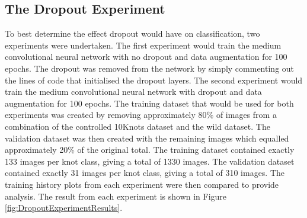 \documentclass{l4proj}
\begin{document}
\subsection{The Dropout Experiment}
To best determine the effect dropout would have on classification, two experiments were undertaken.
The first experiment would train the medium convolutional neural network with no dropout and data augmentation for 100 epochs.
The dropout was removed from the network by simply commenting out the lines of code that initialised the dropout layers.
The second experiment would train the medium convolutional neural network with dropout and data augmentation for 100 epochs.
The training dataset that would be used for both experiments was created by removing approximately 80\% of images from a combination of the controlled 10Knots dataset and the wild dataset.
The validation dataset was then created with the remaining images which equalled approximately 20\% of the original total.
The training dataset contained exactly 133 images per knot class, giving a total of 1330 images.
The validation dataset contained exactly 31 images per knot class, giving a total of 310 images.
The training history plots from each experiment were then compared to provide analysis.
The result from each experiment is shown in Figure \ref{fig:DropoutExperimentResults}.
\end{document}
